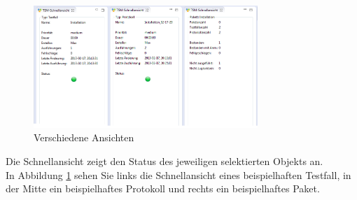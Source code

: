 \documentclass[11pt,a4paper,titlepage]{article}
\begin{document}
\begin{figure}[H]
\centering
\includegraphics[width= 320px]{BilderHandbuch/Quickview/Quickview.png}
\caption{Verschiedene Ansichten}
\label{fig:Quickview}
\end{figure}

Die Schnellansicht zeigt den Status des jeweiligen selektierten Objekts an.\\
In Abbildung \ref{fig:Quickview} sehen Sie links die Schnellansicht eines beispielhaften Testfall, in der Mitte ein beispielhaftes Protokoll und rechts ein beispielhaftes Paket.

\newpage
\end{document}
